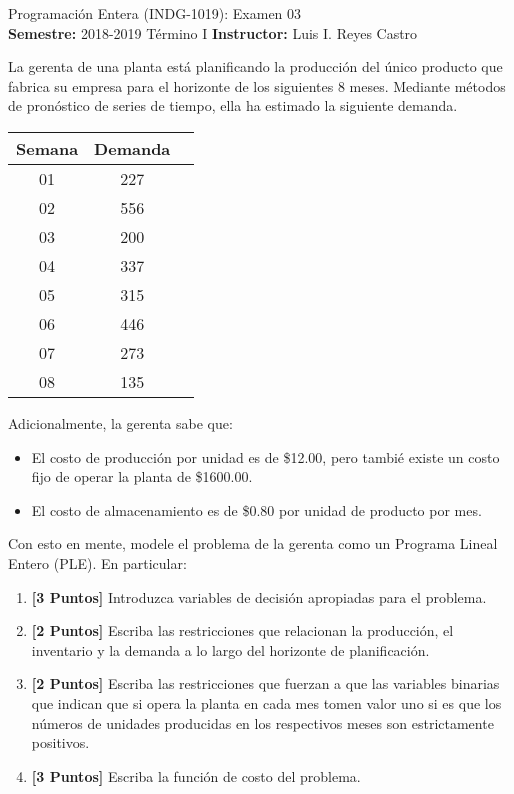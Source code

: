 \documentclass[ a4paper, twoside, 11pt]{article}
\newcommand{\numero}{03}
\begin{document}
\allowdisplaybreaks



\begin{center}
\Large Programaci\'on Entera (INDG-1019): Examen \numero \\[1ex]
\small \textbf{Semestre:} 2018-2019 T\'ermino I \qquad
\textbf{Instructor:} Luis I. Reyes Castro
\end{center}
\fullskip

\begin{problem}
La gerenta de una planta est\'a planificando la producci\'on del \'unico producto que fabrica su empresa para el horizonte de los siguientes 8 meses. Mediante m\'etodos de pron\'ostico de series de tiempo, ella ha estimado la siguiente demanda. 

\begin{table}[htb]
\centering
\label{tab:Problema_Generadores}
\begin{tabular}{|c|c|c|}
\hline
\textbf{Semana}	& \textbf{Demanda} \\ \hline
01 & 227 \\ \hline
02 & 556 \\ \hline
03 & 200 \\ \hline
04 & 337 \\ \hline
05 & 315 \\ \hline
06 & 446 \\ \hline
07 & 273 \\ \hline
08 & 135 \\ \hline
\end{tabular}
\end{table}

Adicionalmente, la gerenta sabe que: 
\begin{itemize}
\item El costo de producci\'on por unidad es de \$12.00, pero tambi\'e existe un costo fijo de operar la planta de \$1600.00. 
\item El costo de almacenamiento es de \$0.80 por unidad de producto por mes. 
\end{itemize}

Con esto en mente, modele el problema de la gerenta como un Programa Lineal Entero (PLE). En particular: 
\begin{enumerate}[label=\textbf{\alph*)}]
\item \textbf{[3 Puntos]} Introduzca variables de decisi\'on apropiadas para el problema. 
\item \textbf{[2 Puntos]} Escriba las restricciones que relacionan la producci\'on, el inventario y la demanda a lo largo del horizonte de planificaci\'on. 
\item \textbf{[2 Puntos]} Escriba las restricciones que fuerzan a que las variables binarias que indican que si opera la planta en cada mes tomen valor uno si es que los n\'umeros de unidades producidas en los respectivos meses son estrictamente positivos. 
\item \textbf{[3 Puntos]} Escriba la funci\'on de costo del problema. 
\end{enumerate}
\QED

\end{problem}
\fullskip
\end{document}
